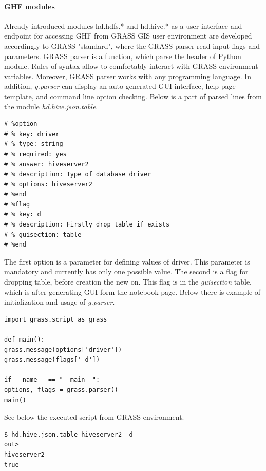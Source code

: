 \documentclass[a4paper,12pt,oneside]{report}
\begin{document}
	\paragraph{GHF modules}
	Already introduced modules hd.hdfs.* and hd.hive.* as a user interface and endpoint
	for accessing GHF from GRASS GIS user environment are developed accordingly to
	GRASS "standard", where the GRASS parser read input flags and parameters. GRASS
	parser is a function, which parse the header of Python module.  Rules of syntax
	allow to comfortably interact with GRASS environment variables. Moreover, GRASS
	parser works with any programming language. In addition, \textit{g.parser} can display
	an auto-generated GUI interface, help page template, and command line option
	checking. 
	Below is a part of parsed lines from the module \textit{hd.hive.json.table}.
	\begin{footnotesize}
		\begin{lstlisting}[style=python]
# %option
# % key: driver
# % type: string
# % required: yes
# % answer: hiveserver2
# % description: Type of database driver
# % options: hiveserver2
# %end
# %flag
# % key: d
# % description: Firstly drop table if exists
# % guisection: table
# %end
		\end{lstlisting}
	\end{footnotesize}
	The first option is a parameter for defining values of driver. This parameter is
	mandatory and currently has only one possible value. The second is a flag for
	dropping table, before creation the new on. This flag is in the
	\textit{guisection} table, which is after generating GUI form the notebook
	page. Below there is example of initialization and usage of \textit{g.parser}.
	\begin{footnotesize}
		\begin{lstlisting}[style=python]
import grass.script as grass

def main():
grass.message(options['driver'])
grass.message(flags['-d'])

if __name__ == "__main__":
options, flags = grass.parser()
main()
		\end{lstlisting}
	\end{footnotesize}
	See below the executed script from GRASS environment.
	\begin{footnotesize}
		\begin{lstlisting}[style=python]
$ hd.hive.json.table hiveserver2 -d
out> 
hiveserver2
true
		\end{lstlisting}
	\end{footnotesize}
	
\end{document}
